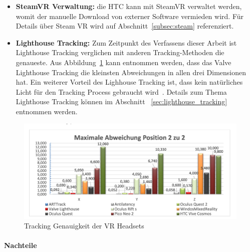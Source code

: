 \begin{itemize}
    \item \textbf{SteamVR Verwaltung:} die HTC kann mit SteamVR verwaltet werden, womit der manuelle Download von externer Software vermieden wird.
    Für Details über Steam VR wird auf Abschnitt~\ref{subsec:steam} referenziert.
    \item \textbf{Lighthouse Tracking:} Zum Zeitpunkt des Verfassens dieser Arbeit ist Lighthouse Tracking verglichen mit anderen Tracking-Methoden die genaueste.
    Aus Abbildung~\ref{fig:tracking_precision_statistic} kann entnommen werden, dass das Valve Lighthouse Tracking die kleinsten Abweichungen in allen drei Dimensionen hat.
    Ein weiterer Vorteil des Lighhouse Tracking ist, dass kein natürliches Licht für den Tracking Process gebraucht wird~\cite{Dennis_Ziesecke_2019}.
    Details zum Thema Lighthouse Tracking können im Abschnitt ~\ref{sec:lighthouse_tracking} entnommen werden.
\end{itemize}

\begin{figure}
    \centering
    \includegraphics[scale=0.4]{pics/tracking_precision_statistic}
    \caption{Tracking Genauigkeit der VR Headsets~\cite{Macedo_2020}}
    \label{fig:tracking_precision_statistic}
\end{figure}

\paragraph{Nachteile}

